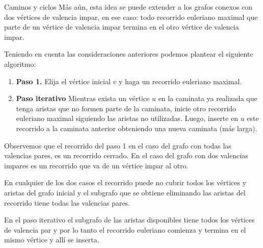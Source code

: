 \begin{section}{Caminos y ciclos}
Más aún, esta idea se puede extender a los grafos conexos con dos vértices de valencia impar, en ese caso: todo recorrido euleriano maximal que parte de un vértice de valencia impar termina en el otro vértice de valencia impar. 

Teniendo en cuenta las consideraciones anteriores podemos plantear el siguiente algoritmo:

\begin{enumerate}
    \item \textbf{Paso 1.} Elija el vértice inicial $v$ y haga un recorrido euleriano maximal. 
    
    
    \item \textbf{Paso iterativo} Mientras exista un vértice $u$ en la caminata ya realizada que tenga aristas que no formen parte de la caminata, inicie otro recorrido  euleriano maximal siguiendo las aristas no utilizadas. Luego,  inserte en $u$ este recorrido a la caminata  anterior obteniendo una nueva caminata (más larga).
\end{enumerate}

Observemos que el recorrido del paso 1 en el caso del grafo con todas las valencias pares, es un recorrido cerrado. En el caso del grafo con dos valencias impares es un recorrido que va de un vértice impar al otro.  
    
En  cualquier de los dos casos el recorrido puede no cubrir todos los vértices y aristas del grafo inicial y el subgrafo que se obtiene eliminando las aristas del recorrido tiene todas las valencias pares. 

En  el paso iterativo el subgrafo de las aristas disponibles tiene todos los vértices de valencia par y por lo tanto el recorrido euleriano comienza y  termina en el mismo vértice y allí se inserta.

\begin{comment}
El  algoritmo es el siguiente: 
\begin{enumerate}
    \item \textbf{Paso 1.} Elija cualquier vértice  inicial $v$ y haga una caminata  que no repita aristas y  que vuelva al vértice (de $v$ a $v$). 
    
    El recorrido formado de esta manera es un recorrido cerrado, pero puede no cubrir todos los vértices y aristas del grafo inicial.

    \item \textbf{Paso iterativo} Mientras exista un vértice $u$ en la caminata ya realizada, pero que tenga aristas que no formen parte de la caminata, inicie otra caminata desde $u$ hasta $u$ siguiendo las aristas no utilizadas. Luego,  inserte esta  caminata a la caminata  anterior para formar una caminata nueva (más larga).
    

\end{comment}
\end{section}
